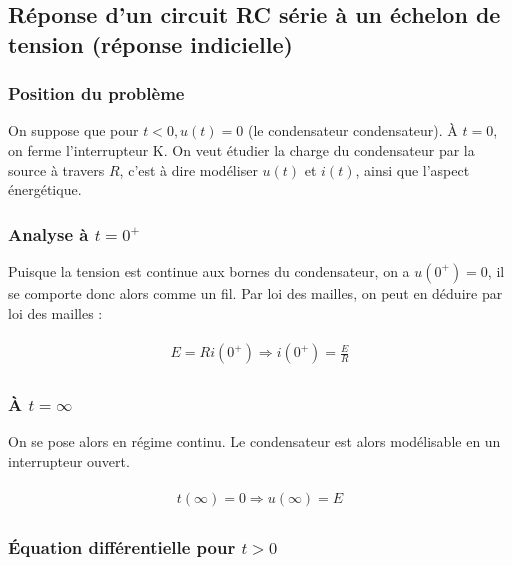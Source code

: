 \documentclass{article}
\begin{document}
\subsection{Réponse d'un circuit RC série à un échelon de tension (réponse indicielle)}

\subsubsection{Position du problème}


On suppose que pour $t<0, u(t)=0$ (le condensateur condensateur). À $t=0$, on ferme l'interrupteur K. On veut étudier la charge du condensateur par la source à travers $R$, c'est à dire modéliser $u(t)$ et $i(t)$, ainsi que l'aspect énergétique.

\subsubsection{Analyse à $t=0^+$}


Puisque la tension est continue aux bornes du condensateur, on a $u(0^+)=0$, il se comporte donc alors comme un fil. Par loi des mailles, on peut en déduire par loi des mailles :

\begin{align*}\begin{split}
E=Ri(0^+) \Longrightarrow i(0^+)=\frac{E}{R}
\end{split}\end{align*}

\subsubsection{À $t=\infty$}

On se pose alors en régime continu. Le condensateur est alors modélisable en un interrupteur ouvert.


\begin{align*}\begin{split}
t(\infty)=0 \Longrightarrow u(\infty)=E
\end{split}\end{align*}

\subsubsection{Équation différentielle pour $t>0$}
\end{document}
